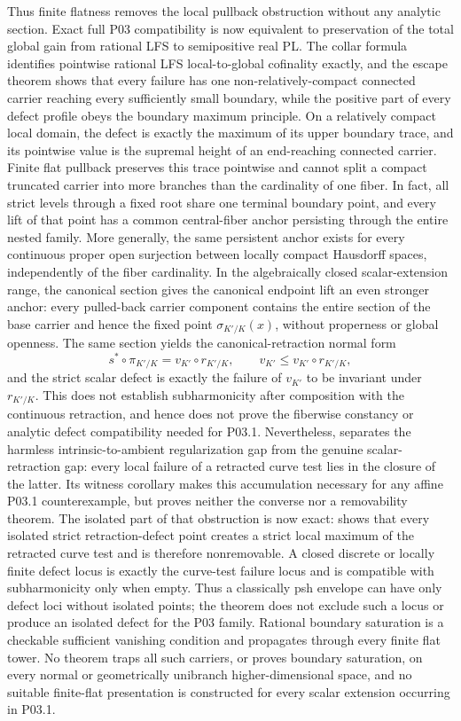 Thus finite flatness removes the local pullback obstruction without any
analytic section.  Exact full P03 compatibility is now equivalent to
preservation of the total global gain from rational LFS to semipositive
real PL.  The collar formula identifies pointwise rational LFS
local-to-global cofinality exactly, and the escape theorem shows that every
failure has one non-relatively-compact connected carrier reaching every
sufficiently small boundary, while the positive part of every defect profile
obeys the boundary maximum principle.  On a relatively compact local domain,
the defect is exactly the maximum of its upper boundary trace, and its
pointwise value is the supremal height of an end-reaching connected carrier.
Finite flat pullback preserves this trace pointwise and cannot split a
compact truncated carrier into more branches than the cardinality of one
fiber.  In fact, all strict levels through a fixed root share one terminal
boundary point, and every lift of that point has a common central-fiber
anchor persisting through the entire nested family.  More generally, the
same persistent anchor exists for every continuous proper open surjection
between locally compact Hausdorff spaces, independently of the fiber
cardinality.  In the algebraically closed scalar-extension range, the
canonical section gives the canonical endpoint lift an even stronger anchor:
every pulled-back carrier component contains the entire section of the base
carrier and hence the fixed point $\sigma_{K'/K}(x)$, without properness or
global openness.  The same section yields the canonical-retraction normal
form
\[
       s^*\circ\pi_{K'/K}=v_{K'}\circ r_{K'/K},
       \qquad v_{K'}\leq v_{K'}\circ r_{K'/K},
\]
and the strict scalar defect is exactly the failure of $v_{K'}$ to be
invariant under $r_{K'/K}$.  This does not establish subharmonicity after
composition with the continuous retraction, and hence does not prove the
fiberwise constancy or analytic defect compatibility needed for P03.1.
Nevertheless,
 separates the harmless
intrinsic-to-ambient regularization gap from the genuine scalar-retraction
gap: every local failure of a retracted curve test lies in the closure of
the latter.  Its witness corollary makes this accumulation necessary for
any affine P03.1 counterexample, but proves neither the converse nor a
removability theorem.
The isolated part of that obstruction is now exact:
 shows that every
isolated strict retraction-defect point creates a strict local maximum of the
retracted curve test and is therefore nonremovable.  A closed discrete or
locally finite defect locus is exactly the curve-test failure locus and is
compatible with subharmonicity only when empty.  Thus a classically psh
envelope can have only defect loci without isolated points; the theorem does
not exclude such a locus or produce an isolated defect for the P03 family.
Rational boundary saturation is a checkable sufficient vanishing condition
and propagates through every finite flat tower.  No theorem traps all such
carriers, or proves boundary saturation, on every normal or geometrically
unibranch higher-dimensional space, and no suitable finite-flat presentation
is constructed for every scalar extension occurring in P03.1.

